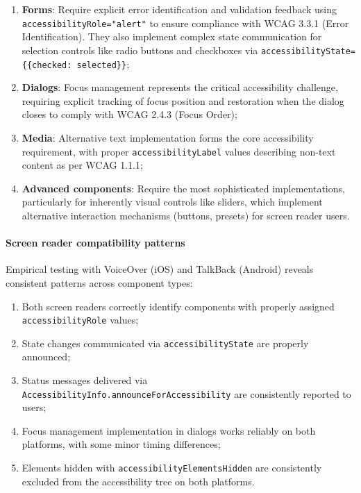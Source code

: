 \begin{enumerate}
    \item \textbf{Forms}: Require explicit error identification and validation feedback using \\ \texttt{accessibilityRole="alert"} to ensure compliance with WCAG 3.3.1 (Error Identification). They also implement complex state communication for selection controls like radio buttons and checkboxes via \texttt{accessibilityState=\{\{checked: selected\}\}};
    
    \item \textbf{Dialogs}: Focus management represents the critical accessibility challenge, requiring explicit tracking of focus position and restoration when the dialog closes to comply with WCAG 2.4.3 (Focus Order);
    
    \item \textbf{Media}: Alternative text implementation forms the core accessibility requirement, with proper \texttt{accessibilityLabel} values describing non-text content as per WCAG 1.1.1;
    
    \item \textbf{Advanced components}: Require the most sophisticated implementations, particularly for inherently visual controls like sliders, which implement alternative interaction mechanisms (buttons, presets) for screen reader users.
\end{enumerate}

\paragraph{Screen reader compatibility patterns}

Empirical testing with VoiceOver (iOS) and TalkBack (Android) reveals consistent patterns across component types:

\begin{enumerate}
    \item Both screen readers correctly identify components with properly assigned \\ \texttt{accessibilityRole} values;
    
    \item State changes communicated via \texttt{accessibilityState} are properly announced;
    
    \item Status messages delivered via \texttt{AccessibilityInfo.announceForAccessibility} are consistently reported to users;
    
    \item Focus management implementation in dialogs works reliably on both platforms, with some minor timing differences;
    
    \item Elements hidden with \texttt{accessibilityElementsHidden} are consistently excluded from the accessibility tree on both platforms.
\end{enumerate}

